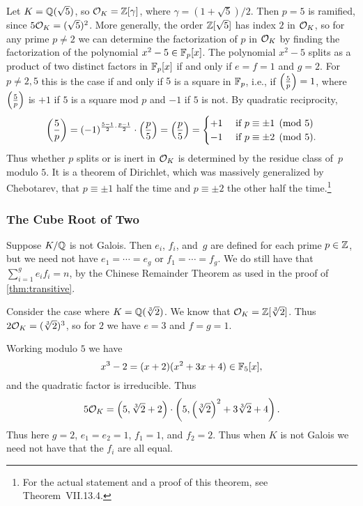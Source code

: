 \begin{example}\label{exam:decompQsqrt5}
  Let $K=\mathbb{Q}(\sqrt{5})$, so $\mathcal{O}_K=\mathbb{Z}[\gamma]$, where
  $\gamma=(1+\sqrt{5})/2$.  Then $p=5$ is ramified, since $5\mathcal{O}_K =
  (\sqrt{5})^2$.  More generally, the order $\mathbb{Z}[\sqrt{5}]$ has index $2$
  in $\mathcal{O}_K$, so for any prime $p\neq 2$ we can determine the
  factorization of $p$ in $\mathcal{O}_K$ by finding the factorization of the
  polynomial $x^2-5\in \mathbb{F}_p[x]$. The polynomial $x^2-5$ splits as a
  product of two distinct factors in $\mathbb{F}_p[x]$ if and only if $e=f=1$
  and $g=2$. For $p\neq 2,5$ this is the case if and only if $5$ is a
  square in $\mathbb{F}_p$, i.e., if $\left(\frac{5}{p}\right) = 1$, where $\left(\frac{5}{p}\right)$ is $+1$
  if $5$ is a square mod $p$ and $-1$ if $5$ is not.  By quadratic
  reciprocity,
  \[
    \left(\frac{5}{p}\right)
    = (-1)^{\frac{5-1}{2}\cdot \frac{p-1}{2}} \cdot \left(\frac{p}{5}\right)
    = \left(\frac{p}{5}\right)
    = \begin{cases}
      +1 & \text{ if } p \equiv \pm 1\pmod{5} \\
      -1 & \text{ if } p \equiv \pm 2\pmod{5}.
    \end{cases}
  \]
  Thus whether $p$ splits or is inert in
  $\mathcal{O}_K$ is determined by the residue class of~$p$
  modulo $5$. It is a theorem of Dirichlet, which was massively
  generalized by Chebotarev, that $p \equiv \pm 1$ half the time
  and $p \equiv \pm 2$ the other half the time.\footnote{
  For the actual statement and a proof of this theorem,
  see \cite{neukirch1999} Theorem~VII.13.4.}
\end{example}

\subsubsection{The Cube Root of Two}

Suppose $K/\mathbb{Q}$ is not Galois.
Then $e_i$, $f_i$, and~$g$ are defined for each prime $p \in \mathbb{Z}$,
but we need not have $e_1=\cdots=e_g$ or $f_1=\cdots =f_g$.  We do still have that
$\sum_{i=1}^g e_i f_i = n$, by the Chinese Remainder Theorem as used in
the proof of \autoref{thm:transitive}.

Consider the case where $K=\mathbb{Q}(\sqrt[3]{2})$. We know that $\mathcal{O}_K = \mathbb{Z}[\sqrt[3]{2}]$.  Thus
$2\mathcal{O}_K = (\sqrt[3]{2})^3$, so for $2$ we have $e=3$ and $f=g=1$.

Working modulo $5$ we have
\[
  x^3 - 2 = (x+2)(x^2+3x+4) \in \mathbb{F}_5[x],
\]
and the quadratic factor is irreducible.  Thus
\[
  5\mathcal{O}_K = \left(5, \sqrt[3]{2} + 2\right) \cdot
  \left(5, \left(\sqrt[3]{2}\right)^2 + 3\sqrt[3]{2} + 4\right).
\]
Thus here $g = 2$, $e_1 = e_2 = 1$, $f_1=1$, and $f_2 = 2$.
Thus when $K$ is not Galois we need not have that the $f_i$
are all equal.

